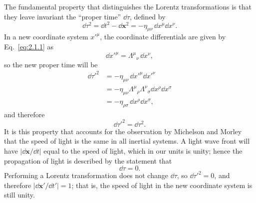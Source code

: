 The fundamental property that distinguishes the Lorentz transformations is that
they leave invariant the ``proper time'' \(\dd\tau\), defined by
\begin{equation}
  \dd\tau^2=\dd t^2-\dd\mathbf{x}^2
  =-\eta_{\mu\nu}\,\dd x^\mu \dd x^\nu .
  \tag{2.1.4}\label{eq:2.1.4}
\end{equation}
In a new coordinate system \(x'^\mu\), the coordinate differentials are given
by Eq.~\eqref{eq:2.1.1} as
\[
  \dd x'^\mu=\Lambda^\mu{}_\nu\,\dd x^\nu ,
\]
so the new proper time will be
\[
\begin{aligned}
  \dd\tau'^2
  &=-\eta_{\mu\nu}\,\dd x'^\mu \dd x'^\nu \\
  &=-\eta_{\mu\nu}\Lambda^\mu{}_\rho\Lambda^\nu{}_\sigma
       \dd x^\rho \dd x^\sigma \\
  &=-\eta_{\rho\sigma}\,\dd x^\rho \dd x^\sigma ,
\end{aligned}
\]
and therefore
\begin{equation}
  \dd\tau'^2=\dd\tau^2 .
  \tag{2.1.5}\label{eq:2.1.5}
\end{equation}
It is this property that accounts for the observation by Michelson and Morley
that the speed of light is the same in all inertial systems. A light wave front
will have \(\lvert \dd\mathbf{x}/\dd t\rvert\) equal to the speed of light, which in
our units is unity; hence the propagation of light is described by the statement
that
\begin{equation}
  \dd\tau=0 .
  \tag{2.1.6}\label{eq:2.1.6}
\end{equation}
Performing a Lorentz transformation does not change \(\dd\tau\), so
\(\dd\tau'^2=0\), and therefore
\(\lvert \dd\mathbf{x}'/\dd t'\rvert=1\); that is, the speed of light in the new
coordinate system is still unity.

